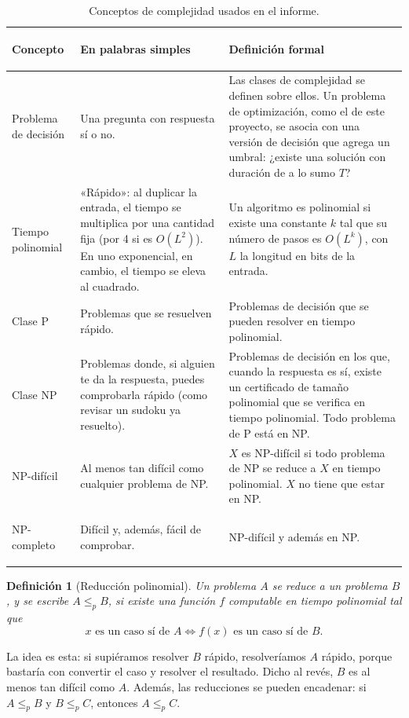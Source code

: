\documentclass[11pt,a4paper]{article}
\theoremstyle{plano}
\newtheorem{definicion}{Definición}[section]
\begin{document}
\begin{table}[h]
\centering\small
\renewcommand{\arraystretch}{1.15}
\begin{tabular}{@{}>{\bfseries\raggedright}p{2.5cm}p{4.3cm}p{6.3cm}@{}}
\toprule
\normalfont\bfseries Concepto & En palabras simples & Definición formal \\
\midrule
Problema de decisión & Una pregunta con respuesta sí o no. & Las clases de complejidad se definen sobre ellos. Un problema de optimización, como el de este proyecto, se asocia con una versión de decisión que agrega un umbral: ¿existe una solución con duración de a lo sumo $T$? \\[4pt]
Tiempo polinomial & «Rápido»: al duplicar la entrada, el tiempo se multiplica por una cantidad fija (por 4 si es $O(L^2)$). En uno exponencial, en cambio, el tiempo se eleva al cuadrado. & Un algoritmo es polinomial si existe una constante $k$ tal que su número de pasos es $O(L^k)$, con $L$ la longitud en bits de la entrada. \\[4pt]
Clase P & Problemas que se resuelven rápido. & Problemas de decisión que se pueden resolver en tiempo polinomial. \\[4pt]
Clase NP & Problemas donde, si alguien te da la respuesta, puedes comprobarla rápido (como revisar un sudoku ya resuelto). & Problemas de decisión en los que, cuando la respuesta es sí, existe un certificado de tamaño polinomial que se verifica en tiempo polinomial. Todo problema de P está en NP. \\[4pt]
NP-difícil & Al menos tan difícil como cualquier problema de NP. & $X$ es NP-difícil si todo problema de NP se reduce a $X$ en tiempo polinomial. $X$ no tiene que estar en NP. \\[4pt]
NP-completo & Difícil y, además, fácil de comprobar. & NP-difícil y además en NP. \\
\bottomrule
\end{tabular}
\caption{Conceptos de complejidad usados en el informe.}
\end{table}

\begin{definicion}[Reducción polinomial]
Un problema $A$ se reduce a un problema $B$, y se escribe $A\le_p B$, si existe una función $f$ computable en tiempo polinomial tal que
\begin{equation}
  x \text{ es un caso sí de } A \iff f(x) \text{ es un caso sí de } B.
\end{equation}
\end{definicion}
La idea es esta: si supiéramos resolver $B$ rápido, resolveríamos $A$ rápido, porque bastaría con convertir el caso y resolver el resultado. Dicho al revés, $B$ es al menos tan difícil como $A$. Además, las reducciones se pueden encadenar: si $A\le_p B$ y $B\le_p C$, entonces $A\le_p C$.
\end{document}
